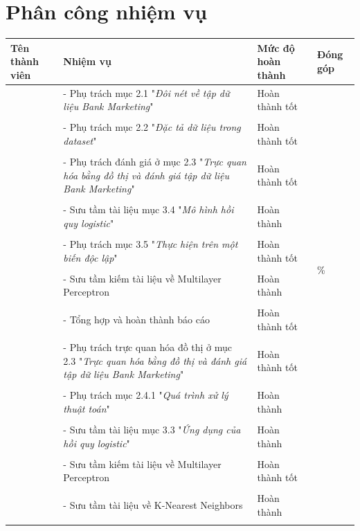 \documentclass{report}
\begin{document}
\section{Phân công nhiệm vụ}
\begin{longtable}{|m{4cm}|m{6cm}|m{2.5cm}|m{2cm}|}\hline
        \centering\fontsize{12}{10}\selectfont\textbf{Tên thành viên} & 
        \centering\fontsize{12}{10}\selectfont\textbf{Nhiệm vụ} &
        \centering\fontsize{12}{10}\selectfont\textbf{Mức độ hoàn thành} &
        \fontsize{12}{10}\selectfont\textbf{Đóng góp} \\
        \hline \newline
        \multirow{18}{4cm}{\centering Thân Trọng Huỳnh Nhân} & - Phụ trách mục 2.1 "\textit{Đôi nét về tập dữ liệu Bank Marketing}" &\centering Hoàn thành tốt &\\&&&\\
        & - Phụ trách mục 2.2 "\textit{Đặc tả dữ liệu trong dataset}" & \centering Hoàn thành tốt & \multirow{16}{2cm}{\centering25\%}\\&&&\\
        & - Phụ trách đánh giá ở mục 2.3 "\textit{Trực quan hóa bằng đồ thị và đánh giá tập dữ liệu Bank Marketing}" & \centering Hoàn thành tốt & \\&&&\\
        & - Sưu tầm tài liệu mục 3.4 "\textit{Mô hình hồi quy logistic}" & \centering Hoàn thành & \\&&&\\
        & - Phụ trách mục 3.5 "\textit{Thực hiện trên một biến độc lập}" & \centering Hoàn thành tốt & \\&&&\\
        & - Sưu tầm kiếm tài liệu về Multilayer Perceptron & \centering Hoàn thành & \\&&&\\
        & - Tổng hợp và hoàn thành báo cáo & \centering Hoàn thành tốt & \\&&&\\
        \hline
        \pagebreak
        \hline
        \multirow{16}{4cm}{\centering Huỳnh Tấn Lợi} & - Phụ trách trực quan hóa đồ thị ở mục 2.3 "\textit{Trực quan hóa bằng đồ thị và đánh giá tập dữ liệu Bank Marketing}" &\centering Hoàn thành tốt & \multirow{16}{2cm}{ \centering 25\%}\\&&&\\
        & - Phụ trách mục 2.4.1 "\textit{Quá trình xử lý thuật toán}" & \centering Hoàn thành  &\\&&&\\
        & - Sưu tầm tài liệu mục 3.3 "\textit{Ứng dụng của hồi quy logistic}" & \centering Hoàn thành & \\&&&\\
        & - Sưu tầm kiếm tài liệu về Multilayer Perceptron & \centering Hoàn thành tốt &\\&&&\\
        & - Sưu tầm tài liệu về K-Nearest Neighbors & \centering Hoàn thành &\\&&&\\
        \hline
        

\end{longtable}
\end{document}
